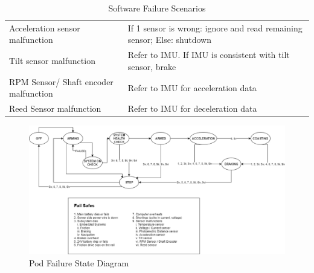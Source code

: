 \begin{table}[p]
\begin{tabular}{@{}p{3cm}p{13cm}@{}}
Acceleration sensor malfunction& If 1 sensor is wrong: ignore and read remaining sensor; Else: shutdown\\
Tilt sensor malfunction & Refer to IMU. If IMU is consistent with tilt sensor, brake \\
RPM Sensor/ Shaft encoder malfunction & Refer to IMU for acceleration data \\
Reed Sensor malfunction & Refer to IMU for deceleration data \\
\bottomrule
\end{tabular}
\caption{Software Failure Scenarios}
\label{tlb:fail-table}
\end{table}

\begin{figure}
  \centering
  \includegraphics[width=\textwidth]{images/Pod_Failure_Diagram.png}
  \caption{ Pod Failure State Diagram}
  \label{fig:pod-failure-state-diagram}
\end{figure}

